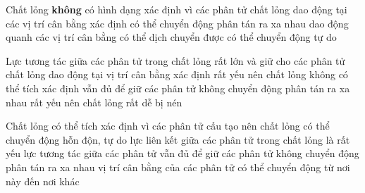 \begin{ex} 
	Chất lỏng \textbf{không} có hình dạng xác định vì các phân tử chất lỏng
	\choice
	{dao động tại các vị trí cân bằng xác định}
	{có thể chuyển động phân tán ra xa nhau}
	{\True dao động quanh các vị trí cân bằng có thể dịch chuyển được}
	{có thể chuyển động tự do}
\end{ex}

\begin{ex} 
	Lực tương tác giữa các phân tử trong chất lỏng
	\choice
	{rất lớn và giữ cho các phân tử chất lỏng dao động tại vị trí cân bằng xác định}
	{rất yếu nên chất lỏng không có thể tích xác định}
	{\True vẫn đủ để giữ các phân tử không chuyển động phân tán ra xa nhau}
	{rất yếu nên chất lỏng rất dễ bị nén}
\end{ex}

\begin{ex} 
	Chất lỏng có thể tích xác định vì
	\choice
	{các phân tử cấu tạo nên chất lỏng có thể chuyển động hỗn độn, tự do}
	{lực liên kết giữa các phân tử trong chất lỏng là rất yếu}
	{\True lực tương tác giữa các phân tử vẫn đủ để giữ các phân tử không chuyển động phân tán ra xa nhau}
	{vị trí cân bằng của các phân tử có thể chuyển động từ nơi này đến nơi khác}
\end{ex}

